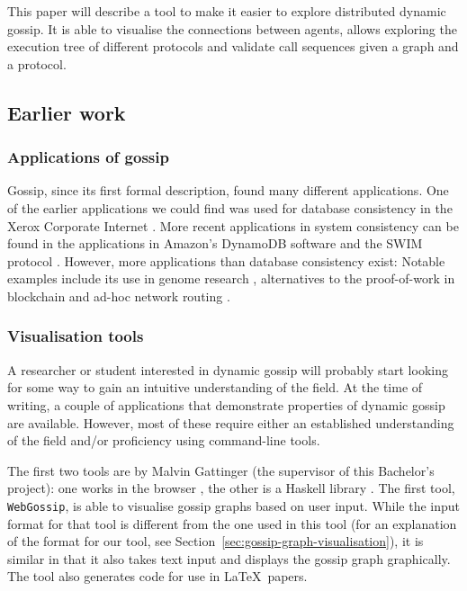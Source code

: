 This paper will describe a tool to make it easier to explore distributed dynamic gossip.
It is able to visualise the connections between agents,
allows exploring the execution tree of different protocols and validate call sequences given a graph and a protocol.

\subsection{Earlier work}

\subsubsection{Applications of gossip}

Gossip, since its first formal description, found many different applications.
One of the earlier applications we could find was used for database consistency in the Xerox Corporate Internet \parencite{demers_epidemic_1988}.
More recent applications in system consistency can be found in the applications in Amazon's DynamoDB software \parencite{decandia_dynamo_2007} and the SWIM protocol \parencite{das_swim_2002}.
However, more applications than database consistency exist:
Notable examples include its use in genome research \parencite{liben-nowell_gossip_2002},
alternatives to the proof-of-work in blockchain \parencite{renesse_blockchain_2016,baird_swirlds_2016} and ad-hoc network routing \parencite{haas_gossip-based_2006}.

\subsubsection{Visualisation tools}

A researcher or student interested in dynamic gossip will probably start looking for some way to gain an intuitive understanding of the field.
At the time of writing, a couple of applications that demonstrate properties of dynamic gossip are available.
However, most of these require either an established understanding of the field and/or proficiency using command-line tools.

The first two tools are by Malvin Gattinger (the supervisor of this Bachelor's project):
one works in the browser \parencite{gattinger_webgossip_2016}, the other is a Haskell library  \parencite{gattinger_m4lvingomoche_2020}. 
The first tool, \texttt{WebGossip}, is able to visualise gossip graphs based on user input.
While the input format for that tool is different from the one used in this tool
(for an explanation of the format for our tool, see Section~\ref{sec:gossip-graph-visualisation}),
it is similar in that it also takes text input and displays the gossip graph graphically.
The tool also generates code for use in \LaTeX\ papers.

